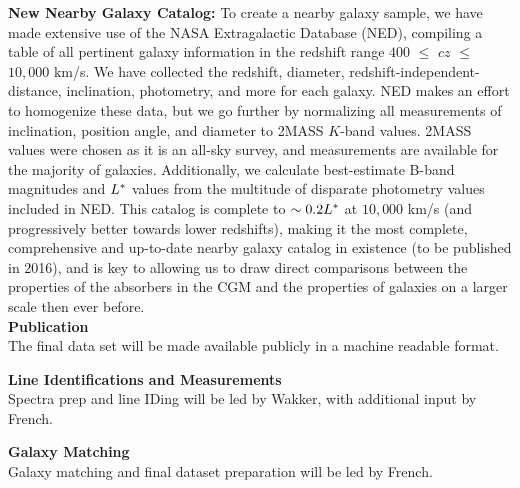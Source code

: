 \documentclass[12pt]{article}
\begin{document}
\noindent \textbf{New Nearby Galaxy Catalog:} To create a nearby galaxy sample, we have made extensive use of the NASA Extragalactic Database (NED), compiling a table of all pertinent galaxy information in the redshift range $400$ $\leq$ $cz$ $\leq$ $10,000$ km/s. We have collected the redshift, diameter, redshift-independent-distance, inclination, photometry, and more for each galaxy. NED makes an effort to homogenize these data, but we go further by normalizing all measurements of inclination, position angle, and diameter to 2MASS $K$-band values. 2MASS values were chosen as it is an all-sky survey, and measurements are available for the majority of galaxies. Additionally, we calculate best-estimate B-band magnitudes and $L^{\**}$ values from the multitude of disparate photometry values included in NED. This catalog is complete to $\sim0.2 L^{\**}$ at $10,000$ km/s (and progressively better towards lower redshifts), making it the most complete, comprehensive and up-to-date nearby galaxy catalog in existence (to be published in 2016), and is key to allowing us to draw direct comparisons between the properties of the absorbers in the CGM and the properties of galaxies on a larger scale then ever before.\\


\noindent \textbf{Publication}\\
\indent The final data set will be made available publicly in a machine readable format.



%
%
\budgetnarrative       %

\textbf{Line Identifications and Measurements}\\
\indent Spectra prep and line IDing will be led by Wakker, with additional input by French.

\noindent \textbf{Galaxy Matching}\\
\indent Galaxy matching and final dataset preparation will be led by French.
\end{document}
